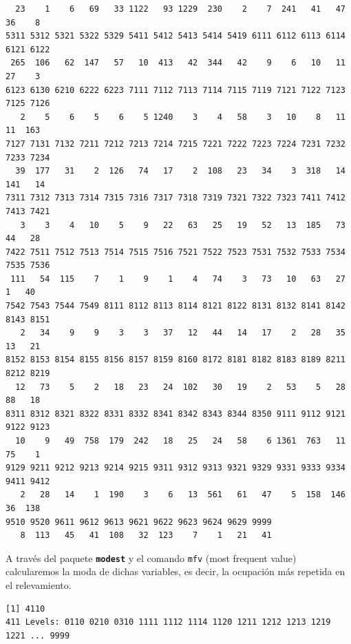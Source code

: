 \documentclass[
]{article}
\newenvironment{Shaded}{\begin{snugshade}}{\end{snugshade}}
\newcommand{\AttributeTok}[1]{\textcolor[rgb]{0.13,0.29,0.53}{#1}}
\newcommand{\ConstantTok}[1]{\textcolor[rgb]{0.56,0.35,0.01}{#1}}
\newcommand{\FunctionTok}[1]{\textcolor[rgb]{0.13,0.29,0.53}{\textbf{#1}}}
\newcommand{\NormalTok}[1]{#1}
\newcommand{\SpecialCharTok}[1]{\textcolor[rgb]{0.81,0.36,0.00}{\textbf{#1}}}
\begin{document}
\begin{verbatim}
  23    1    6   69   33 1122   93 1229  230    2    7  241   41   47   36    8 
5311 5312 5321 5322 5329 5411 5412 5413 5414 5419 6111 6112 6113 6114 6121 6122 
 265  106   62  147   57   10  413   42  344   42    9    6   10   11   27    3 
6123 6130 6210 6222 6223 7111 7112 7113 7114 7115 7119 7121 7122 7123 7125 7126 
   2    5    6    5    6    5 1240    3    4   58    3   10    8   11   11  163 
7127 7131 7132 7211 7212 7213 7214 7215 7221 7222 7223 7224 7231 7232 7233 7234 
  39  177   31    2  126   74   17    2  108   23   34    3  318   14  141   14 
7311 7312 7313 7314 7315 7316 7317 7318 7319 7321 7322 7323 7411 7412 7413 7421 
   3    3    4   10    5    9   22   63   25   19   52   13  185   73   44   28 
7422 7511 7512 7513 7514 7515 7516 7521 7522 7523 7531 7532 7533 7534 7535 7536 
 111   54  115    7    1    9    1    4   74    3   73   10   63   27    1   40 
7542 7543 7544 7549 8111 8112 8113 8114 8121 8122 8131 8132 8141 8142 8143 8151 
   2   34    9    9    3    3   37   12   44   14   17    2   28   35   13   21 
8152 8153 8154 8155 8156 8157 8159 8160 8172 8181 8182 8183 8189 8211 8212 8219 
  12   73    5    2   18   23   24  102   30   19    2   53    5   28   88   18 
8311 8312 8321 8322 8331 8332 8341 8342 8343 8344 8350 9111 9112 9121 9122 9123 
  10    9   49  758  179  242   18   25   24   58    6 1361  763   11   75    1 
9129 9211 9212 9213 9214 9215 9311 9312 9313 9321 9329 9331 9333 9334 9411 9412 
   2   28   14    1  190    3    6   13  561   61   47    5  158  146   36  138 
9510 9520 9611 9612 9613 9621 9622 9623 9624 9629 9999 
   8  113   45   41  108   32  123    7    1   21   41 
\end{verbatim}

A través del paquete \textbf{\texttt{modest}} y el comando \texttt{mfv} (most frequent value) calcularemos la moda de dichas variables, es decir, la ocupación más repetida en el relevamiento.

\begin{Shaded}
\end{Shaded}

\begin{verbatim}
[1] 4110
411 Levels: 0110 0210 0310 1111 1112 1114 1120 1211 1212 1213 1219 1221 ... 9999
\end{verbatim}
\end{document}
